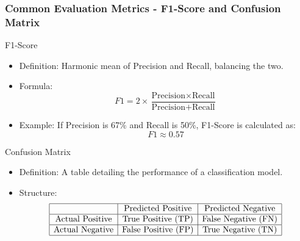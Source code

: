 \documentclass[aspectratio=169]{beamer}
\begin{document}
\begin{frame}[fragile]
    \frametitle{Common Evaluation Metrics - F1-Score and Confusion Matrix}
    \begin{block}{F1-Score}
        \begin{itemize}
            \item Definition: Harmonic mean of Precision and Recall, balancing the two.
            \item Formula: 
            \[
            F1 = 2 \times \frac{\text{Precision} \times \text{Recall}}{\text{Precision} + \text{Recall}}
            \]
            \item Example: If Precision is 67\% and Recall is 50\%, F1-Score is calculated as:
            \[
            F1 \approx 0.57
            \]
        \end{itemize}
    \end{block}

    \begin{block}{Confusion Matrix}
        \begin{itemize}
            \item Definition: A table detailing the performance of a classification model.
            \item Structure:
            \[
            \begin{array}{|c|c|c|}
            \hline
            & \text{Predicted Positive} & \text{Predicted Negative} \\
            \hline
            \text{Actual Positive} & \text{True Positive (TP)} & \text{False Negative (FN)} \\
            \hline
            \text{Actual Negative} & \text{False Positive (FP)} & \text{True Negative (TN)} \\
            \hline
            \end{array}
            \]
        \end{itemize}
    \end{block}
\end{frame}
\end{document}
